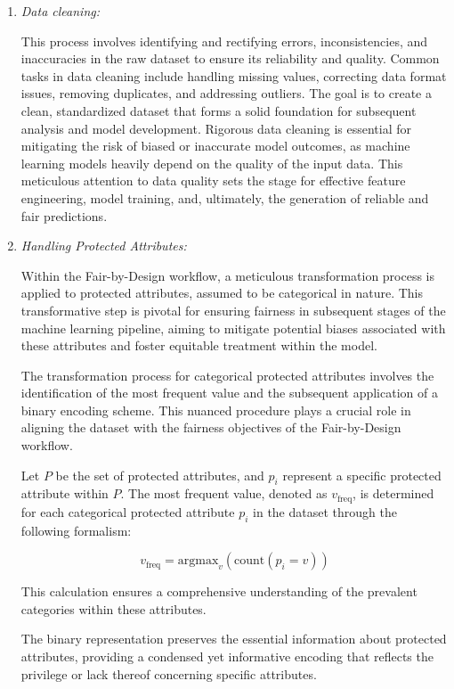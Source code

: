 \begin{enumerate}

    \item \emph{Data cleaning:} 

    This process involves identifying and rectifying errors, inconsistencies, and inaccuracies in the raw dataset to ensure its reliability and quality. Common tasks in data cleaning include handling missing values, correcting data format issues, removing duplicates, and addressing outliers. The goal is to create a clean, standardized dataset that forms a solid foundation for subsequent analysis and model development. Rigorous data cleaning is essential for mitigating the risk of biased or inaccurate model outcomes, as machine learning models heavily depend on the quality of the input data. This meticulous attention to data quality sets the stage for effective feature engineering, model training, and, ultimately, the generation of reliable and fair predictions.

    \item \emph{Handling Protected Attributes:} 
    
    Within the Fair-by-Design workflow, a meticulous transformation process is applied to protected attributes, assumed to be categorical in nature. This transformative step is pivotal for ensuring fairness in subsequent stages of the machine learning pipeline, aiming to mitigate potential biases associated with these attributes and foster equitable treatment within the model.

    The transformation process for categorical protected attributes involves the identification of the most frequent value and the subsequent application of a binary encoding scheme. This nuanced procedure plays a crucial role in aligning the dataset with the fairness objectives of the Fair-by-Design workflow.

    Let $P$ be the set of protected attributes, and $p_i$ represent a specific protected attribute within $P$. The most frequent value, denoted as $v_{\text{freq}}$, is determined for each categorical protected attribute $p_i$ in the dataset through the following formalism:

    \[
    v_{\text{freq}} = \text{argmax}_v \left( \text{count}(p_i = v) \right)
    \]
    
    This calculation ensures a comprehensive understanding of the prevalent categories within these attributes.

    The binary representation preserves the essential information about protected attributes, providing a condensed yet informative encoding that reflects the privilege or lack thereof concerning specific attributes.


\end{enumerate}
